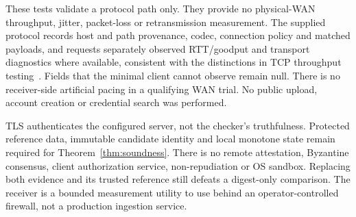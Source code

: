 These tests validate a protocol path only. They provide no physical-WAN
throughput, jitter, packet-loss or retransmission measurement. The supplied
protocol records host and path provenance, codec, connection policy and matched
payloads, and requests separately observed RTT/goodput and transport diagnostics
where available, consistent with the distinctions in TCP throughput
testing~\cite{rfc6349}. Fields that the minimal client cannot observe remain
null. There is no receiver-side artificial pacing in a qualifying WAN trial. No
public upload, account creation or credential search was performed.

TLS authenticates the configured server, not the checker's truthfulness. Protected
reference data, immutable candidate identity and local monotone state remain
required for Theorem~\ref{thm:soundness}. There is no remote attestation, Byzantine
consensus, client authorization service, non-repudiation or OS sandbox. Replacing
both evidence and its trusted reference still defeats a digest-only comparison.
The receiver is a bounded measurement utility to use behind an operator-controlled
firewall, not a production ingestion service.

